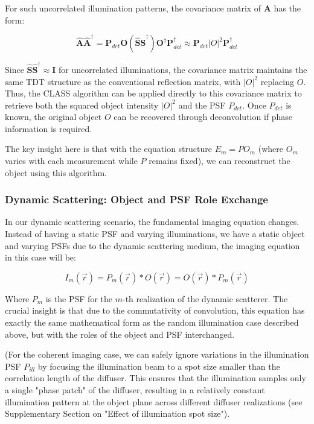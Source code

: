 \documentclass[12pt]{article}
\newenvironment{ourresponse}
    {\begin{tcolorbox}[width=\linewidth,breakable,enhanced,colback=gray!5,colframe=responsecolor!50,title=Response,left=5pt,right=5pt]}
    {\end{tcolorbox}}
\begin{document}
\begin{ourresponse}
For such uncorrelated illumination patterns, the covariance matrix of $\mathbf{A}$ has the form:

\begin{equation}
\hat{\mathbf{A}} \hat{\mathbf{A}}^{\dagger} = \mathbf{P}_{det} \mathbf{O} (\hat{\mathbf{S}} \hat{\mathbf{S}}^{\dagger}) \mathbf{O}^{\dagger} \mathbf{P}_{det}^{\dagger} \approx \mathbf{P}_{det} |O|^2 \mathbf{P}_{det}^{\dagger}
\end{equation}

Since $\hat{\mathbf{S}} \hat{\mathbf{S}}^{\dagger} \approx \mathbf{I}$ for uncorrelated illuminations, the covariance matrix maintains the same TDT structure as the conventional reflection matrix, with $|O|^2$ replacing $O$. Thus, the CLASS algorithm can be applied directly to this covariance matrix to retrieve both the squared object intensity $|O|^2$ and the PSF $P_{det}$. Once $P_{det}$ is known, the original object $O$ can be recovered through deconvolution if phase information is required.

The key insight here is that with the equation structure $E_m = P O_m$ (where $O_m$ varies with each measurement while $P$ remains fixed), we can reconstruct the object using this algorithm.

\subsubsection*{Dynamic Scattering: Object and PSF Role Exchange}

In our dynamic scattering scenario, the fundamental imaging equation changes. Instead of having a static PSF and varying illuminations, we have a static object and varying PSFs due to the dynamic scattering medium, the imaging equation in this case will be:

\begin{equation}
I_m(\vec{r}) = P_m(\vec{r}) * O(\vec{r}) = O(\vec{r}) * P_m(\vec{r})
\end{equation}

Where $P_m$ is the PSF for the $m$-th realization of the dynamic scatterer. The crucial insight is that due to the commutativity of convolution, this equation has exactly the same mathematical form as the random illumination case described above, but with the roles of the object and PSF interchanged.

(For the coherent imaging case, we can safely ignore variations in the illumination PSF $P_{ill}$ by focusing the illumination beam to a spot size smaller than the correlation length of the diffuser. This ensures that the illumination samples only a single "phase patch" of the diffuser, resulting in a relatively constant illumination pattern at the object plane across different diffuser realizations (see Supplementary Section on "Effect of illumination spot size").


\end{ourresponse}
\end{document}
